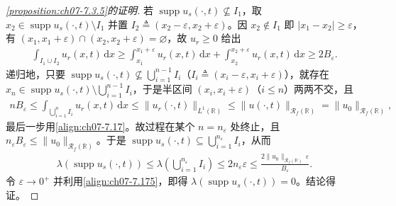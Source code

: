 \documentclass[../../main.tex]{subfiles}%
\begin{document}
\begin{proof}[\cref{proposition:ch07-7.3.5}的证明]
若 $\operatorname{supp}u_s(\cdot,t)\not\subseteq I_1$，取 $x_2\in\operatorname{supp}u_s(\cdot,t)\setminus I_1$ 并置 $I_2\triangleq(x_2-\varepsilon,x_2+\varepsilon)$。因 $x_2\notin I_1$ 即 $|x_1-x_2|\geqslant\varepsilon$，有 $(x_1,x_1+\varepsilon)\cap(x_2,x_2+\varepsilon)=\varnothing$，故 $u_r\geqslant0$ 给出
\begin{align*}
\int_{I_1\cup I_2}u_r(x,t)\,\mathrm{d}x\geqslant\int_{x_1}^{x_1+\varepsilon}u_r(x,t)\,\mathrm{d}x+\int_{x_2}^{x_2+\varepsilon}u_r(x,t)\,\mathrm{d}x\geqslant2B_\varepsilon.
\end{align*}
递归地，只要 $\operatorname{supp}u_s(\cdot,t)\not\subseteq\bigcup_{i=1}^{n-1}I_i$（$I_i\triangleq(x_i-\varepsilon,x_i+\varepsilon)$），就存在 $x_n\in\operatorname{supp}u_s(\cdot,t)\setminus\bigcup_{i=1}^{n-1}I_i$，于是半区间 $(x_i,x_i+\varepsilon)$（$i\leqslant n$）两两不交，且
\begin{align*}
nB_\varepsilon\leqslant\int_{\bigcup_{i=1}^nI_i}u_r(x,t)\,\mathrm{d}x\leqslant\|u_r(\cdot,t)\|_{L^1(\mathbb{R})}\leqslant\|u(\cdot,t)\|_{\mathscr{R}_f(\mathbb{R})}=\|u_0\|_{\mathscr{R}_f(\mathbb{R})},
\end{align*}
最后一步用\eqref{align:ch07-7.17}。故过程在某个 $n=n_\varepsilon$ 处终止，且 $n_\varepsilon B_\varepsilon\leqslant\|u_0\|_{\mathscr{R}_f(\mathbb{R})}$。于是 $\operatorname{supp}u_s(\cdot,t)\subseteq\bigcup_{i=1}^{n_\varepsilon}I_i$，从而
\begin{align*}
\lambda(\operatorname{supp}u_s(\cdot,t))\leqslant\lambda\!\left(\bigcup_{i=1}^{n_\varepsilon}I_i\right)\leqslant2n_\varepsilon\varepsilon\leqslant\frac{2\|u_0\|_{\mathscr{R}_f(\mathbb{R})}\,\varepsilon}{B_\varepsilon}.
\end{align*}
令 $\varepsilon\to0^+$ 并利用\eqref{align:ch07-7.175}，即得 $\lambda(\operatorname{supp}u_s(\cdot,t))=0$。结论得证。
\end{proof}
\end{document}
